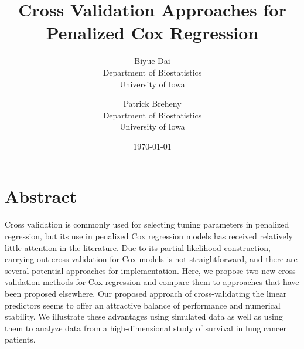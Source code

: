 \documentclass{article}
\title{Cross Validation Approaches for Penalized Cox Regression}
\author{Biyue Dai\\Department of Biostatistics\\University of Iowa
  \and
  Patrick Breheny\\Department of Biostatistics\\University of Iowa}
\date{\today}
\begin{document}
\maketitle

\section*{Abstract}
Cross validation is commonly used for selecting tuning parameters in penalized regression, but its use in penalized Cox regression models has received relatively little attention in the literature. Due to its partial likelihood construction, carrying out cross validation for Cox models is not straightforward, and there are several potential approaches for implementation. Here, we propose two new cross-validation methods for Cox regression and compare them to approaches that have been proposed elsewhere.
Our proposed approach of cross-validating the linear predictors seems to offer an attractive balance of performance and numerical stability. We illustrate these advantages using simulated data as well as using them to analyze data from a high-dimensional study of survival in lung cancer patients.




\end{document}
